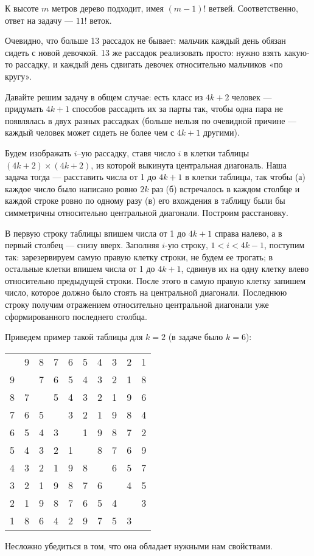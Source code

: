 ﻿
\begin{itemize}

\itA К высоте $m$ метров дерево подходит, имея $(m-1)!$ ветвей. Соответственно, ответ на задачу — $11!$ веток.

\itB Очевидно, что больше 13 рассадок не бывает: мальчик каждый день обязан сидеть с новой девочкой. 13 же рассадок реализовать просто: нужно взять какую-то рассадку, и каждый день сдвигать девочек относительно мальчиков «по кругу».

\itC Давайте решим задачу в общем случае: есть класс из $4k+2$ человек — придумать $4k+1$ способов рассадить их за парты так, чтобы одна пара не появлялась в двух разных рассадках (больше нельзя по очевидной причине — каждый человек может сидеть не более чем с $4k+1$ другими).

Будем изображать $i$--ую рассадку, ставя число $i$ в клетки таблицы $(4k+2) \times (4k+2)$, из которой выкинута центральная диагональ. Наша задача тогда — расставить числа от 1 до $4k+1$ в клетки таблицы, так чтобы (а) каждое число было написано ровно $2k$ раз (б) встречалось в каждом столбце и каждой строке ровно по одному разу (в) его вхождения в таблицу были бы симметричны относительно центральной диагонали. Построим расстановку.

В первую строку таблицы впишем числа от 1 до $4k+1$ справа налево, а в первый столбец — снизу вверх. Заполняя $i$-ую строку, $1<i<4k-1$, поступим так: зарезервируем самую правую клетку строки, не будем ее трогать; в остальные клетки впишем числа от 1 до $4k+1$, сдвинув их на одну клетку влево относительно предыдущей строки. После этого в самую правую клетку запишем число, которое должно было стоять на центральной диагонали. Последнюю строку получим отражением относительно центральной диагонали уже сформированного последнего столбца.

Приведем пример такой таблицы для $k=2$ (в задаче было $k=6$):

\begin{center}
\begin{tabular}{|cccccccccc|}

\hline
  & 9 & 8 & 7 & 6 & 5 & 4 & 3 & 2 & 1 \\
9 &   & 7 & 6 & 5 & 4 & 3 & 2 & 1 & 8 \\
8 & 7 &   & 5 & 4 & 3 & 2 & 1 & 9 & 6 \\
7 & 6 & 5 &   & 3 & 2 & 1 & 9 & 8 & 4 \\
6 & 5 & 4 & 3 &   & 1 & 9 & 8 & 7 & 2 \\
5 & 4 & 3 & 2 & 1 &   & 8 & 7 & 6 & 9 \\
4 & 3 & 2 & 1 & 9 & 8 &   & 6 & 5 & 7 \\
3 & 2 & 1 & 9 & 8 & 7 & 6 &   & 4 & 5 \\
2 & 1 & 9 & 8 & 7 & 6 & 5 & 4 &   & 3 \\
1 & 8 & 6 & 4 & 2 & 9 & 7 & 5 & 3 &  \\ \hline

\end{tabular}
\end{center}

\noindent Несложно убедиться в том, что она обладает нужными нам свойствами.

\end{itemize}
